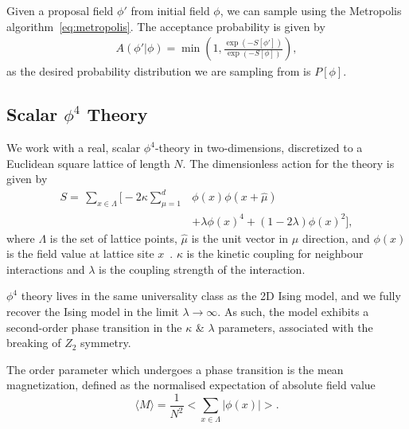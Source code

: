 \documentclass[11pt]{article}
\begin{document}
    Given a proposal field $\phi'$ from initial field $\phi$, we can sample using the Metropolis algorithm~\eqref{eq:metropolis}.
    The acceptance probability is given by
    \begin{equation}\label{eq:accept_prob_lft}
    \begin{aligned}
        A(\phi'|\phi) = \min \left(1, \frac{\exp(-S[\phi'])}{\exp(-S[\phi])} \right),
    \end{aligned}
    \end{equation}
    as the desired probability distribution we are sampling from is $P[\phi]$.

\subsection{Scalar $\phi^4$ Theory}\label{subsec:phi^4_theory}
    We work with a real, scalar $\phi^4$-theory in two-dimensions, discretized to a Euclidean square lattice of length $N$.
    The dimensionless action for the theory is given by
    \begin{equation}\label{eq:phi4_action}
    \begin{aligned}
        S = \,\sum\limits_{x \in \Lambda} \Biggl[-2\kappa \sum\limits_{\mu=1}^d & \phi(x) \phi(x+\hat{\mu}) \\
        &+\lambda \phi(x)^4 + (1 - 2\lambda) \phi(x)^2 \Biggr],
    \end{aligned}
    \end{equation}
    where $\Lambda$ is the set of lattice points, $\hat{\mu}$ is the unit vector in $\mu$ direction, and $\phi(x)$ is
    the field value at lattice site $x$~\cite{maas2020lattice}. $\kappa$ is the kinetic coupling for neighbour interactions and $\lambda$ is the
    coupling strength of the interaction.

    $\phi^4$ theory lives in the same universality class as the 2D Ising model, and we fully recover the Ising model
    in the limit $\lambda \rightarrow \infty$.
    As such, the model exhibits a second-order phase transition in the $\kappa$ \& $\lambda$ parameters, associated
    with the breaking of $Z_2$ symmetry.

    The order parameter which undergoes a phase transition is the mean magnetization, defined as the normalised
    expectation of absolute field value
    \begin{equation}\label{eq:magnetization}
        \langle M \rangle = \frac{1}{N^2} \bigl< \sum_{x \in \Lambda} |\phi(x)| \bigr>.
    \end{equation}
\end{document}
